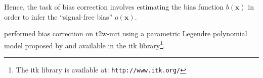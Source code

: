 \begin{enumerate}[leftmargin=*]
Hence, the task of bias correction involves estimating the bias function $b(\mathbf{x})$ in order to infer the ``signal-free bias'' $o(\mathbf{x})$.%

\cite{Viswanath2009} performed bias correction on \ac{t2w}-\ac{mri} using a parametric Legendre polynomial model proposed by \cite{Styner2000} and available in the \ac{itk} library\footnote{The \ac{itk} library is available at: \texttt{http://www.itk.org/}}.%

%
%
%
%
%
%


\end{enumerate}
